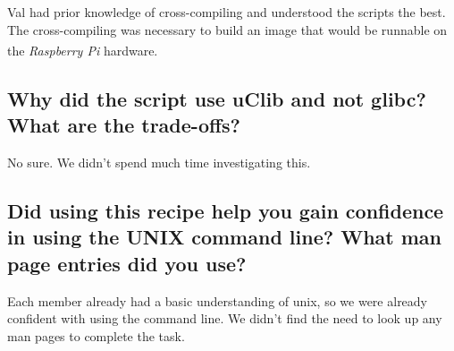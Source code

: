 \documentclass[11pt,a4paper,titlepage]{report}
\newcommand{\rpi}{\textit{Raspberry Pi\textsuperscript{\textregistered}}}
\begin{document}
\begin{appendices}
Val had prior knowledge of cross-compiling and understood the scripts the best. The cross-compiling was necessary to build an image that would be runnable on the \rpi\xspace hardware. 

\subsection*{Why did the script use uClib and not glibc? What are the trade-offs?}

No sure. We didn't spend much time investigating this.

\subsection*{Did using this recipe help you gain confidence in using the UNIX command 
line? What man page entries did you use? }

Each member already had a basic understanding of unix, so we were already confident with using the command line. We didn't find the need to look up any man pages to complete the task. 

\end{appendices}


\nocite{*}
\printbibliography[heading=bibintoc]
\end{document}
